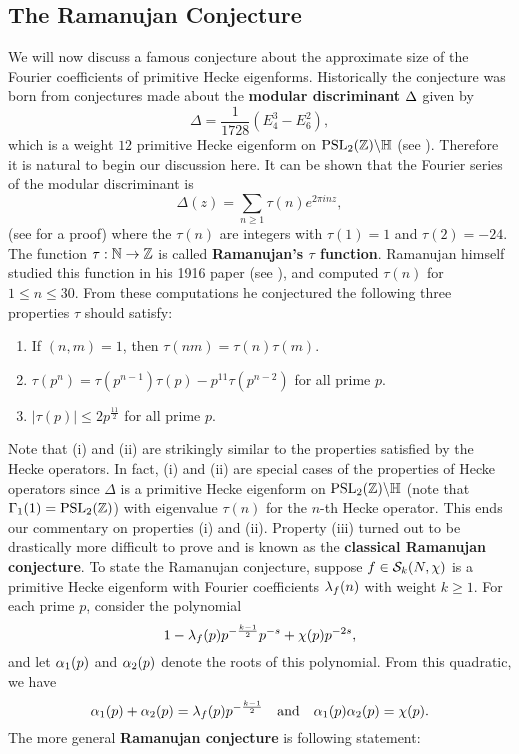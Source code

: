     \subsection*{The Ramanujan Conjecture}
      We will now discuss a famous conjecture about the approximate size of the Fourier coefficients of primitive Hecke eigenforms. Historically the conjecture was born from conjectures made about the \textbf{modular discriminant} $\Delta$ given by
      \[
        \Delta = \frac{1}{1728}(E_{4}^{3}-E_{6}^{2}),
      \]
      which is a weight $12$ primitive Hecke eigenform on $\mathrm{PSL}_{2}(\mathbb{Z})\backslash\mathbb{H}$ (see \cite{diamond2005first}). Therefore it is natural to begin our discussion here. It can be shown that the Fourier series of the modular discriminant is
      \[
        \Delta(z) = \sum_{n \ge 1}\tau(n)e^{2\pi i nz},
      \]
      (see \cite{apostol1976introduction} for a proof) where the $\tau(n)$ are integers with $\tau(1) = 1$ and $\tau(2) = -24$. The function $\tau:\mathbb{N} \to \mathbb{Z}$ is called \textbf{Ramanujan's $\tau$ function}. Ramanujan himself studied this function in his 1916 paper (see \cite{ramanujan1916certain}), and computed $\tau(n)$ for $1 \le n \le 30$. From these computations he conjectured the following three properties $\tau$ should satisfy:
      \begin{enumerate}[label=(\roman*)]
        \item If $(n,m) = 1$, then $\tau(nm) = \tau(n)\tau(m)$.
        \item $\tau(p^{n}) = \tau(p^{n-1})\tau(p)-p^{11}\tau(p^{n-2})$ for all prime $p$.
        \item $|\tau(p)| \le 2p^{\frac{11}{2}}$ for all prime $p$.
      \end{enumerate}
      Note that (i) and (ii) are strikingly similar to the properties satisfied by the Hecke operators. In fact, (i) and (ii) are special cases of the properties of Hecke operators since $\Delta$ is a primitive Hecke eigenform on $\mathrm{PSL}_{2}(\mathbb{Z})\backslash\mathbb{H}$ (note that $\Gamma_{1}(1) = \mathrm{PSL}_{2}(\mathbb{Z})$) with eigenvalue $\tau(n)$ for the $n$-th Hecke operator. This ends our commentary on properties (i) and (ii). Property (iii) turned out to be drastically more difficult to prove and is known as the \textbf{classical Ramanujan conjecture}. To state the Ramanujan conjecture, suppose $f \in \mathcal{S}_{k}(N,\chi)$ is a primitive Hecke eigenform with Fourier coefficients $\lambda_{f}(n)$ with weight $k \ge 1$. For each prime $p$, consider the polynomial
      \[
        1-\lambda_{f}(p)p^{-\frac{k-1}{2}}p^{-s}+\chi(p)p^{-2s},
      \]
      and let $\alpha_{1}(p)$ and $\alpha_{2}(p)$ denote the roots of this polynomial. From this quadratic, we have
      \[
        \alpha_{1}(p)+\alpha_{2}(p) = \lambda_{f}(p)p^{-\frac{k-1}{2}} \quad \text{and} \quad \alpha_{1}(p)\alpha_{2}(p) = \chi(p).
      \]
      The more general \textbf{Ramanujan conjecture} is following statement:


